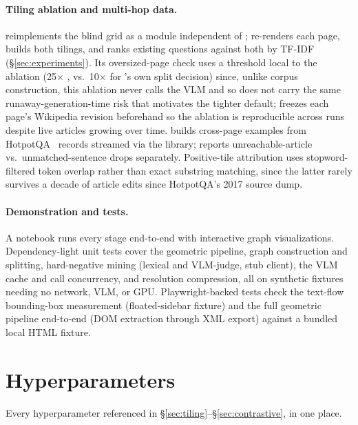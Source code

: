 \paragraph{Tiling ablation and multi-hop data.}  reimplements the blind grid as a module independent of ;  re-renders each page, builds both tilings, and ranks existing questions against both by TF-IDF (\S\ref{sec:experiments}). Its oversized-page check uses a threshold local to the ablation (25$\times$ , vs.\ 10$\times$ for 's own split decision) since, unlike corpus construction, this ablation never calls the VLM and so does not carry the same runaway-generation-time risk that motivates the tighter default;  freezes each page's Wikipedia revision beforehand so the ablation is reproducible across runs despite live articles growing over time.  builds cross-page examples from HotpotQA~\citep{hotpotqa2018} records streamed via the  library;  reports unreachable-article vs.\ unmatched-sentence drops separately. Positive-tile attribution uses stopword-filtered token overlap rather than exact substring matching, since the latter rarely survives a decade of article edits since HotpotQA's 2017 source dump.

\paragraph{Demonstration and tests.} A notebook runs every stage end-to-end with interactive  graph visualizations. Dependency-light unit tests cover the geometric pipeline, graph construction and splitting, hard-negative mining (lexical and VLM-judge, stub client), the VLM cache and call concurrency, and resolution compression, all on synthetic fixtures needing no network, VLM, or GPU. Playwright-backed tests check the text-flow bounding-box measurement (floated-sidebar fixture) and the full geometric pipeline end-to-end (DOM extraction through XML export) against a bundled local HTML fixture.

\section{Hyperparameters}
\label{sec:appendix-hyperparams}

Every hyperparameter referenced in \S\ref{sec:tiling}--\S\ref{sec:contrastive}, in one place.

